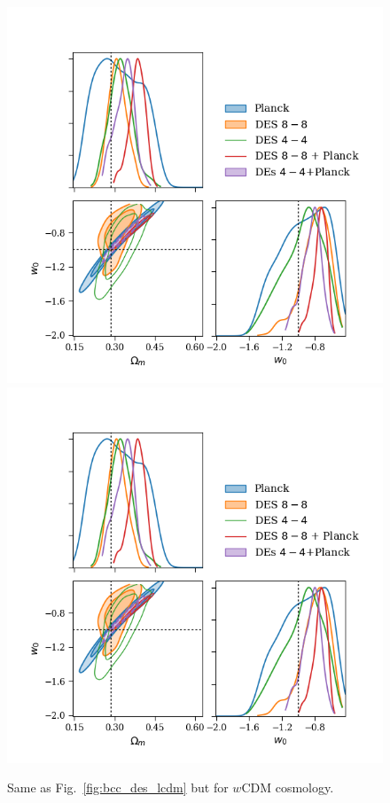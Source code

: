 \documentclass[fleqn,usenatbib]{mnras}
\begin{document}
\begin{figure}
\includegraphics[width=\columnwidth]{figs/buzzard_wcdm_lin_om-w.png}
\includegraphics[width=\columnwidth]{figs/buzzard_wcdm_lin_om-w.png}
\caption[]{Same as Fig.~\ref{fig:bcc_des_lcdm} but for $w$CDM cosmology.}
\label{fig:bcc_des_wcdm}
\end{figure}
\end{document}
